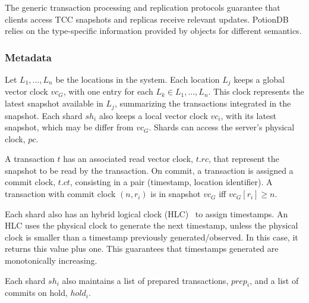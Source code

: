 \documentclass[sigplan,twocolumn,review,anonymous]{acmart}
\begin{document}
The generic transaction processing and replication protocols guarantee that clients access
TCC snapshots and replicas receive relevant updates. PotionDB relies on the type-specific 
information provided by objects for different semantics.

\subsubsection{Metadata}
\label{subsec:metadata}


Let $L_1,...,L_n$ be the locations in the system. 
Each location $L_j$ keeps a global vector clock $\mathit{vc}_G$, with one entry for each $L_k \in L_1,...,L_n$.
This clock represents the latest snapshot available in $L_j$, summarizing the transactions integrated in the snapshot.
Each shard $\mathit{sh}_i$ also keeps a local vector clock $\mathit{vc}_i$, with its 
latest snapshot, which may be differ 
from $\mathit{vc}_G$.
Shards can access the server's physical clock, $\mathit{pc}$.

A transaction $t$ has an associated read vector clock, $t\!.\mathit{rc}$,  that represent the snapshot
to be read by the transaction. On commit, a transaction is assigned a commit clock, $t\!.\mathit{ct}$, consisting in a 
pair (timestamp, location identifier).  A transaction with commit clock $(n,r_i)$ is in snapshot $\mathit{vc}_G$ iff
$\mathit{vc}_G[r_i] \geq n$.

Each shard also has an hybrid logical clock (HLC)~\cite{hlc} to assign timestamps. An HLC uses the 
physical clock to generate the next timestamp, unless the physical clock is smaller than a timestamp
previously generated/observed. In this case, it returns this value plus one. 
This guarantees that timestamps generated are monotonically increasing.

Each shard $\mathit{sh}_i$ also maintains a list of prepared transactions, $\mathit{prep_i}$, and a list of commits on hold, $\mathit{hold}_i$.
\end{document}
